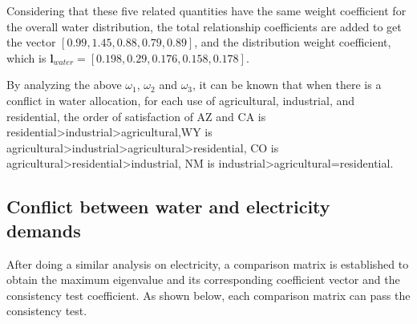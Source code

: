 \documentclass{mcmthesis}
\begin{document}
\newpage
Considering that these five related quantities have the same weight coefficient for the overall water distribution, the total relationship coefficients are added to get the vector $[0.99,1.45,0.88,0.79,0.89]$, and the distribution weight coefficient, which is $\boldsymbol{ l}_{water}=[0.198,0.29,0.176,0.158,0.178]$.

By analyzing the above $\omega_1$, $\omega_2$ and $\omega_3$, it can be known that when there is a conflict in water allocation, for each use of agricultural, industrial, and residential, the order of satisfaction of AZ and CA is residential>industrial>agricultural,WY is agricultural>industrial>agricultural>residential, CO is agricultural>residential>industrial, NM is industrial>agricultural=residential.
\subsection{Conflict between water and electricity demands}
After doing a similar analysis on electricity, a comparison matrix is established to obtain the maximum eigenvalue and its corresponding coefficient vector and the consistency test coefficient. As shown below, each comparison matrix can pass the consistency test.
\end{document}
